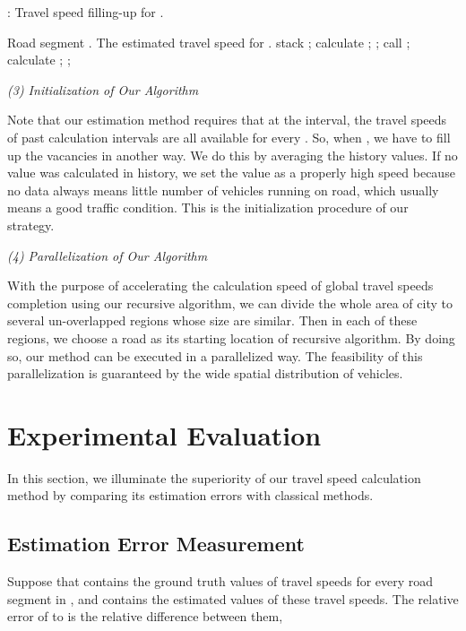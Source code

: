\documentclass[twocolumn,10pt,final,conference]{IEEEtran}
\begin{document}
\begin{algorithm}[h]
\small
\caption{: Travel speed filling-up for .}
\label{alg-current travel speeds filling-up for r.}
\begin{algorithmic}
\REQUIRE Road segment .
\ENSURE  The estimated travel speed  for .
\STATE stack ;
\STATE calculate ;
\ELSE
\STATE ;
\STATE call ;
\ENDFOR
\STATE calculate ;
\STATE ;
\ENDIF
\end{algorithmic}
\end{algorithm}
\emph{(3) Initialization of Our Algorithm}
\quad

Note that our estimation method requires that at the  interval, the travel speeds of past  calculation intervals are all available for every . So, when , we have to fill up the vacancies in another way. We do this by averaging the history values. If no value was calculated in history, we set the value as a properly high speed because no data always means little number of vehicles running on road, which usually means a good traffic condition. This is the initialization procedure of our strategy.

\emph{(4) Parallelization of Our Algorithm}
\quad

With the purpose of accelerating the calculation speed of global travel speeds completion using our recursive algorithm, we can divide the whole area of city to several un-overlapped regions whose size are similar. Then in each of these regions, we choose a road as its starting location of recursive algorithm. By doing so, our method can be executed  in a parallelized way. The feasibility of this parallelization is guaranteed by the wide spatial distribution of vehicles.
\section{Experimental Evaluation}\label{section-Experimental Evaluation}
In this section, we illuminate the superiority of our travel speed calculation method by comparing its estimation errors with classical methods.
\subsection{Estimation Error Measurement}
Suppose that  contains the ground truth values of travel speeds for every road segment in , and  contains the estimated values of these travel speeds. The relative error of  to  is the relative difference between them, 
\end{document}

